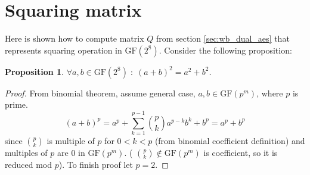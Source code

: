 \documentclass[11pt,oneside,final]{fithesis2}
\newtheorem{myprop}{Proposition}
\newcommand{\gfe}{\ensuremath{\text{GF}\left(2^8\right)}}
\begin{document}
    \section{Squaring matrix}\label{appendix:sqr_matrix}
    Here is shown how to compute matrix $Q$ from section \ref{sec:wb_dual_aes} that represents squaring operation in $\gfe$. Consider the following proposition:
    
    \begin{myprop}\label{prop:squaring_is_linear}
     $\forall a,b \in \gfe \; : \; \left(a + b\right)^2 = a^2 + b^2$. 
    \end{myprop}
    \begin{proof}
    From binomial theorem, assume general case, $a,b \in \text{GF}(p^m)$, where $p$ is prime.
    \begin{equation*}
     (a+b)^p = a^p + \sum_{k=1}^{p-1} \binom{p}{k} a^{p-k}b^{k} + b^p = a^p + b^p
    \end{equation*}
    since $\binom{p}{k}$ is multiple of $p$ for $0 < k < p$ (from binomial coefficient definition) and multiples of $p$ are $0$ in $\text{GF}(p^m)$. (
    $\binom{p}{k} \notin \text{GF}(p^m)$ is coefficient, so it is reduced mod $p$). To finish proof let $p=2$.
    \end{proof}
\end{document}
